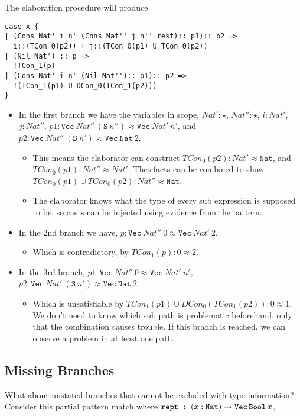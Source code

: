 The elaboration procedure will produce
 
\begin{lstlisting}[basicstyle={\ttfamily\small}]
case x {
| (Cons Nat' i n' (Cons Nat'' j n'' rest):: p1):: p2 =>
  i::(TCon_0(p2)) + j::(TCon_0(p1) U TCon_0(p2))
| (Nil Nat') :: p =>
  !TCon_1(p)
| (Cons Nat' i n' (Nil Nat''):: p1):: p2 =>
  !(TCon_1(p1) U DCon_0(TCon_1(p2)))
}
\end{lstlisting}
 
\begin{itemize}
\item
In the first branch we have the variables in scope, $Nat':\star$, $Nat'':\star$, $i:Nat'$, $j:Nat''$, $p1:\mathtt{Vec}\ Nat''\ (\mathtt{S}\ n'')\approx\mathtt{Vec}\ Nat'\ n'$, and $p2:\mathtt{Vec}\ Nat''\ (\mathtt{S}\ n')\approx\mathtt{Vec}\ \mathtt{Nat}\ 2$.
\begin{itemize}
\item
This means the elaborator can construct $TCon_0(p2):Nat'\approx\mathtt{Nat}$, and $TCon_0(p1):Nat''\approx Nat'$.
Thes facts can be combined to show $TCon_0(p1) \cup TCon_0(p2):Nat''\approx\mathtt{Nat}$.
\item
The elaborator knows what the type of every sub expression is supposed to be, so casts can be injected using evidence from the pattern.
\end{itemize}
\item
In the 2nd branch we have, $p:\mathtt{Vec}\ Nat''\ 0\approx\mathtt{Vec}\ Nat'\ 2$.
\begin{itemize}
\item
Which is contradictory, by $TCon_1(p):0\approx2$.
\end{itemize}
\item
{}
In the 3rd branch, $p1:\mathtt{Vec}\ Nat''\ 0\approx\mathtt{Vec}\ Nat'\ n'$, $p2:\mathtt{Vec}\ Nat'\ (\mathtt{S}\ n')\approx\mathtt{Vec}\ \mathtt{Nat}\ 2$.
\begin{itemize}
\item
Which is unsatisfiable by $TCon_1(p1) \cup DCon_0(TCon_1(p2)):0\approx1$.
We don't need to know which sub path is problematic beforehand, only that the combination causes trouble.
If this branch is reached, we can observe a problem in at least one path.
\end{itemize}
\end{itemize}
 
\subsection{Missing Branches}
What about unstated branches that cannot be excluded with type information?
Consider this partial pattern match where $\mathtt{rept}\ :\ (x: \mathtt{Nat}{}) \rightarrow \mathtt{Vec}{}\,\mathtt{Bool}{}\,x$,
 
